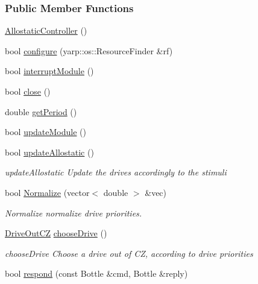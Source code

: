 \subsubsection*{Public Member Functions}
\begin{DoxyCompactItemize}
\item 
\hyperlink{group__allostaticController_ae80a5d7d6996241bbeeea5e32072e411}{Allostatic\+Controller} ()
\item 
bool \hyperlink{group__allostaticController_ae55423793b89f1649296e82dc8ee0527}{configure} (yarp\+::os\+::\+Resource\+Finder \&rf)
\item 
bool \hyperlink{group__allostaticController_abbadd8c4806800a86ee6f4896079ffe2}{interrupt\+Module} ()
\item 
bool \hyperlink{group__allostaticController_a7968a168c0bf3409c0a82078e651cdbc}{close} ()
\item 
double \hyperlink{group__allostaticController_a6963bd52b9b2c5962bac39354601a61c}{get\+Period} ()
\item 
bool \hyperlink{group__allostaticController_aace595e55a9517470a9d241b64e57c22}{update\+Module} ()
\item 
bool \hyperlink{group__allostaticController_a448eb3497467e10577e6a03ef55633f3}{update\+Allostatic} ()
\begin{DoxyCompactList}\small\item\em update\+Allostatic Update the drives accordingly to the stimuli \end{DoxyCompactList}\item 
bool \hyperlink{group__allostaticController_a335dd66e9d7384168be21d74451f13e1}{Normalize} (vector$<$ double $>$ \&vec)
\begin{DoxyCompactList}\small\item\em Normalize normalize drive priorities. \end{DoxyCompactList}\item 
\hyperlink{group__allostaticController_structDriveOutCZ}{Drive\+Out\+CZ} \hyperlink{group__allostaticController_a695d63459d3e78fdd5b024d5c3504742}{choose\+Drive} ()
\begin{DoxyCompactList}\small\item\em choose\+Drive Choose a drive out of CZ, according to drive priorities \end{DoxyCompactList}\item 
bool \hyperlink{group__allostaticController_ae647895ab1c78e36dbc52fed8b276120}{respond} (const Bottle \&cmd, Bottle \&reply)
\end{DoxyCompactItemize}


